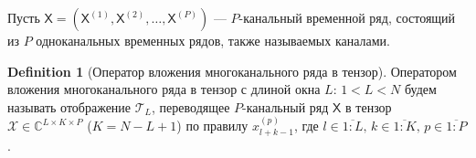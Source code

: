 \documentclass[12pt]{article}
\newcommand{\tX}{\mathsf{X}}
\newcommand{\calX}{\mathcal{X}}
\newcommand{\calT}{\mathcal{T}}
\theoremstyle{definition}
\newtheorem{definition}{Definition}
\theoremstyle{remark}
\begin{document}
Пусть $\tX = (\tX^{(1)}, \tX^{(2)}, \ldots, \tX^{(P)})$ --- $P$-канальный
временной ряд, состоящий из $P$ одноканальных временных рядов, также
называемых каналами.
\begin{definition}[Оператор вложения многоканального ряда в тензор]
  Оператором вложения многоканального ряда в тензор с длиной окна $L$:
  ${1< L < N}$ будем называть отображение $\calT_{L}$, переводящее $P$-канальный
  ряд $\tX$ в тензор $\calX \in \mathbb{C}^{L\times K \times P}$ \linebreak
  (${K = N - L + 1}$)
  по правилу $x_{l+k-1}^{(p)}$, где $l \in \overline{1:L},\, k \in
  \overline{1:K},\, p \in \overline{1:P}$.
\end{definition}

%
\end{document}
